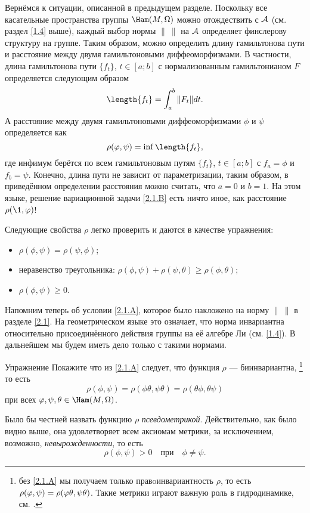 Вернёмся к ситуации, описанной в предыдущем разделе.
Поскольку все касательные пространства группы $\Ham(M, \Omega)$ можно
отождествить с $\mathcal{A}$ (см. раздел \ref{1.4} выше), каждый выбор нормы
$\|\ \|$ на $\mathcal{A}$ определяет финслерову структуру на группе.
Таким образом, можно определить длину гамильтонова пути и расстояние между двумя гамильтоновыми диффеоморфизмами.
В частности, длина гамильтонова пути $\{f_t\}$, $t \in [a; b]$ с нормализованным гамильтонианом $F$ определяется следующим образом 
\[\length\{f_t\}=\int_a^b \| F_t \| dt.\]
А расстояние между двумя гамильтоновыми диффеоморфизмами $\phi$ и $\psi$ определяется как
\[\rho (\phi, \psi) = \inf \length \{f_t\},\] 
где инфимум берётся по всем гамильтоновым путям $\{f_t\}$, $t \in [a; b]$ с $f_a = \phi$ и $f_b = \psi$.
Конечно, длина пути не зависит от параметризации, таким образом, в приведённом определении расстояния можно считать, что $a = 0$ и $b = 1$.
На этом языке, решение вариационной задачи
\ref{2.1.B} есть ничто иное, как расстояние $\rho (\1, \phi)$!

Следующие свойства $\rho$ легко проверить и даются в качестве упражнения:
\begin{itemize}
\item $\rho (\phi, \psi) = \rho (\psi, \phi)$;
\item неравенство треугольника: $\rho (\phi, \psi) + \rho (\psi, \theta) \ge \rho (\phi, \theta)$;
\item $\rho (\phi, \psi) \ge 0$.
\end{itemize}

Напомним теперь об условии \ref{2.1.A}, которое было накложено на норму $\|\ \|$ в разделе \ref{2.1}.
На геометрическом языке это означает, что норма инвариантна относительно присоединённого действия группы на её алгебре Ли (см. \ref{1.4}).
В дальнейшем мы будем иметь дело только с такими нормами.

\begin{ex*}{Упражнение}
Покажите что из \ref{2.1.A} следует, что функция $\rho$ --- биинвариантна,%
\footnote{без \ref{2.1.A} мы получаем только правoинвариантность $\rho$, то есть $\rho (\phi, \psi) \z= \rho (\phi\theta, \psi\theta)$.
Такие метрики играют важную роль в гидродинамике, см. \cite{AK}.}
то есть
\[\rho (\phi, \psi) = \rho (\phi \theta, \psi \theta) = \rho (\theta\phi, \theta\psi)\]
при всех $\phi, \psi, \theta \in \Ham (M, \Omega)$.
\end{ex*}

Было бы честней назвать функцию $\rho$ \emph{псевдометрикой}.
Действительно, как было видно выше, она удовлетворяет всем аксиомам метрики, за исключением, возможно, \emph{невырожденности}, то есть 
\begin{equation}
\rho (\phi, \psi)> 0
\quad\text{при}\quad
\phi \ne \psi.
\label{eq:2.2.A}
\end{equation}

